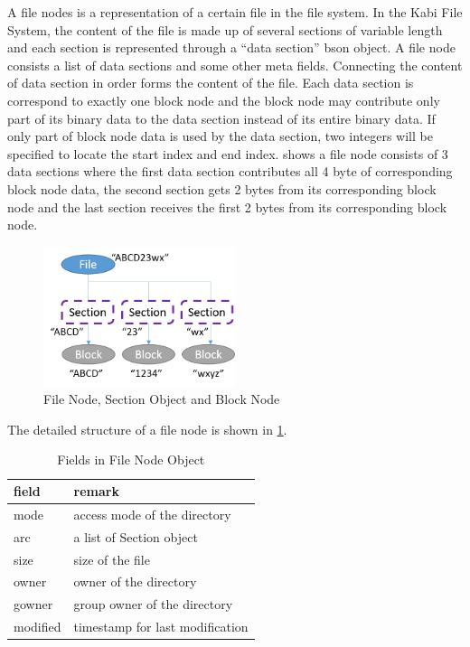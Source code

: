     A file nodes is a representation of a certain file in the file system. In the Kabi File System, the content of the file is made up of several sections of variable length and each section is represented through a “data section” bson object. A file node consists a list of data sections and some other meta fields. Connecting the content of data section in order forms the content of the file. Each data section is correspond to exactly one block node and the block node may contribute only part of its binary data to the data section instead of its entire binary data. If only part of block node data is used by the data section, two integers will be specified to locate the start index and end index.  shows a file node consists of 3 data sections where the first data section contributes all 4 byte of corresponding block node data, the second section gets 2 bytes from its corresponding block node and the last section receives the first 2 bytes from its corresponding block node.

\begin{figure}[hbtp]
\centering
\includegraphics[width=0.5\textwidth]{Chapter-3/figs/fig7.png}
\caption{File Node, Section Object and Block Node}
\label{fig:file_and_section}
\end{figure}

	The detailed structure of a file node is shown in \ref{tab:file_fields}.

\begin{table}
\caption{Fields in File Node Object}
\label{tab:file_fields}
\begin{center}
\begin{tabular}{ll}
\toprule
field & remark\\
\midrule
mode & access mode of the directory\\
arc & a list of Section object\\
size & size of the file\\
owner & owner of the directory\\
gowner & group owner of the directory\\
modified & timestamp for last modification\\
\bottomrule
\end{tabular}
\end{center}
\end{table}

